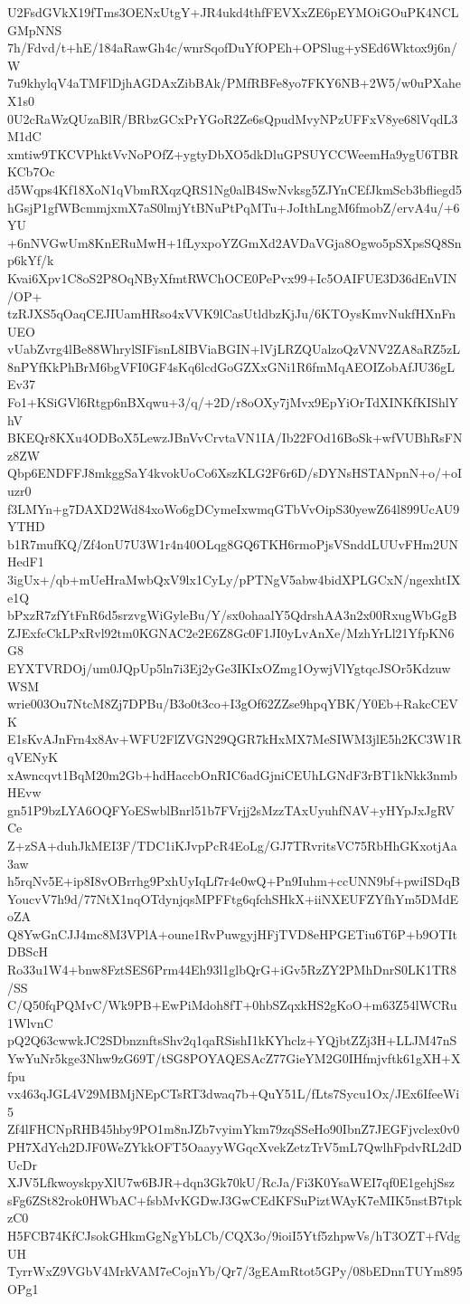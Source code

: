 U2FsdGVkX19fTms3OENxUtgY+JR4ukd4thfFEVXxZE6pEYMOiGOuPK4NCLGMpNNS
7h/Fdvd/t+hE/184aRawGh4c/wnrSqofDuYfOPEh+OPSlug+ySEd6Wktox9j6n/W
7u9khylqV4aTMFlDjhAGDAxZibBAk/PMfRBFe8yo7FKY6NB+2W5/w0uPXaheX1s0
0U2cRaWzQUzaBlR/BRbzGCxPrYGoR2Ze6sQpudMvyNPzUFFxV8ye68lVqdL3M1dC
xmtiw9TKCVPhktVvNoPOfZ+ygtyDbXO5dkDluGPSUYCCWeemHa9ygU6TBRKCb7Oc
d5Wqps4Kf18XoN1qVbmRXqzQRS1Ng0alB4SwNvksg5ZJYnCEfJkmScb3bfliegd5
hGsjP1gfWBcmmjxmX7aS0lmjYtBNuPtPqMTu+JoIthLngM6fmobZ/ervA4u/+6YU
+6nNVGwUm8KnERuMwH+1fLyxpoYZGmXd2AVDaVGja8Ogwo5pSXpsSQ8Snp6kYf/k
Kvai6Xpv1C8oS2P8OqNByXfmtRWChOCE0PePvx99+Ic5OAIFUE3D36dEnVIN/OP+
tzRJXS5qOaqCEJIUamHRso4xVVK9lCasUtldbzKjJu/6KTOysKmvNukfHXnFnUEO
vUabZvrg4lBe88WhrylSIFisnL8IBViaBGIN+lVjLRZQUalzoQzVNV2ZA8aRZ5zL
8nPYfKkPhBrM6bgVFI0GF4sKq6lcdGoGZXxGNi1R6fmMqAEOIZobAfJU36gLEv37
Fo1+KSiGVl6Rtgp6nBXqwu+3/q/+2D/r8oOXy7jMvx9EpYiOrTdXINKfKIShlYhV
BKEQr8KXu4ODBoX5LewzJBnVvCrvtaVN1IA/Ib22FOd16BoSk+wfVUBhRsFNz8ZW
Qbp6ENDFFJ8mkggSaY4kvokUoCo6XszKLG2F6r6D/sDYNsHSTANpnN+o/+oIuzr0
f3LMYn+g7DAXD2Wd84xoWo6gDCymeIxwmqGTbVvOipS30yewZ64l899UcAU9YTHD
b1R7mufKQ/Zf4onU7U3W1r4n40OLqg8GQ6TKH6rmoPjsVSnddLUUvFHm2UNHedF1
3igUx+/qb+mUeHraMwbQxV9lx1CyLy/pPTNgV5abw4bidXPLGCxN/ngexhtIXe1Q
bPxzR7zfYtFnR6d5srzvgWiGyleBu/Y/sx0ohaalY5QdrshAA3n2x00RxugWbGgB
ZJExfcCkLPxRvl92tm0KGNAC2e2E6Z8Gc0F1JI0yLvAnXe/MzhYrLl21YfpKN6G8
EYXTVRDOj/um0JQpUp5ln7i3Ej2yGe3IKIxOZmg1OywjVlYgtqcJSOr5KdzuwWSM
wrie003Ou7NtcM8Zj7DPBu/B3o0t3co+I3gOf62ZZse9hpqYBK/Y0Eb+RakcCEVK
E1sKvAJnFrn4x8Av+WFU2FlZVGN29QGR7kHxMX7MeSIWM3jlE5h2KC3W1RqVENyK
xAwncqvt1BqM20m2Gb+hdHaccbOnRIC6adGjniCEUhLGNdF3rBT1kNkk3nmbHEvw
gn51P9bzLYA6OQFYoESwblBnrl51b7FVrjj2sMzzTAxUyuhfNAV+yHYpJxJgRVCe
Z+zSA+duhJkMEI3F/TDC1iKJvpPcR4EoLg/GJ7TRvritsVC75RbHhGKxotjAa3aw
h5rqNv5E+ip8I8vOBrrhg9PxhUyIqLf7r4e0wQ+Pn9Iuhm+ccUNN9bf+pwiISDqB
YoucvV7h9d/77NtX1nqOTdynjqsMPFFtg6qfchSHkX+iiNXEUFZYfhYm5DMdEoZA
Q8YwGnCJJ4mc8M3VPlA+oune1RvPuwgyjHFjTVD8eHPGETiu6T6P+b9OTItDBScH
Ro33u1W4+bnw8FztSES6Prm44Eh93l1glbQrG+iGv5RzZY2PMhDnrS0LK1TR8/SS
C/Q50fqPQMvC/Wk9PB+EwPiMdoh8fT+0hbSZqxkHS2gKoO+m63Z54lWCRu1WlvnC
pQ2Q63cwwkJC2SDbnznftsShv2q1qaRSishI1kKYhclz+YQjbtZZj3H+LLJM47nS
YwYuNr5kge3Nhw9zG69T/tSG8POYAQESAcZ77GieYM2G0IHfmjvftk61gXH+Xfpu
vx463qJGL4V29MBMjNEpCTsRT3dwaq7b+QuY51L/fLts7Sycu1Ox/JEx6IfeeWi5
Zf4lFHCNpRHB45hby9PO1m8nJZb7vyimYkm79zqSSeHo90IbnZ7JEGFjvclex0v0
PH7XdYch2DJF0WeZYkkOFT5OaayyWGqcXvekZetzTrV5mL7QwlhFpdvRL2dDUcDr
XJV5LfkwoyskpyXlU7w6BJR+dqn3Gk70kU/RcJa/Fi3K0YsaWEI7qf0E1gehjSsz
sFg6ZSt82rok0HWbAC+fsbMvKGDwJ3GwCEdKFSuPiztWAyK7eMIK5nstB7tpkzC0
H5FCB74KfCJsokGHkmGgNgYbLCb/CQX3o/9ioiI5Ytf5zhpwVs/hT3OZT+fVdgUH
TyrrWxZ9VGbV4MrkVAM7eCojnYb/Qr7/3gEAmRtot5GPy/08bEDnnTUYm895OPg1
